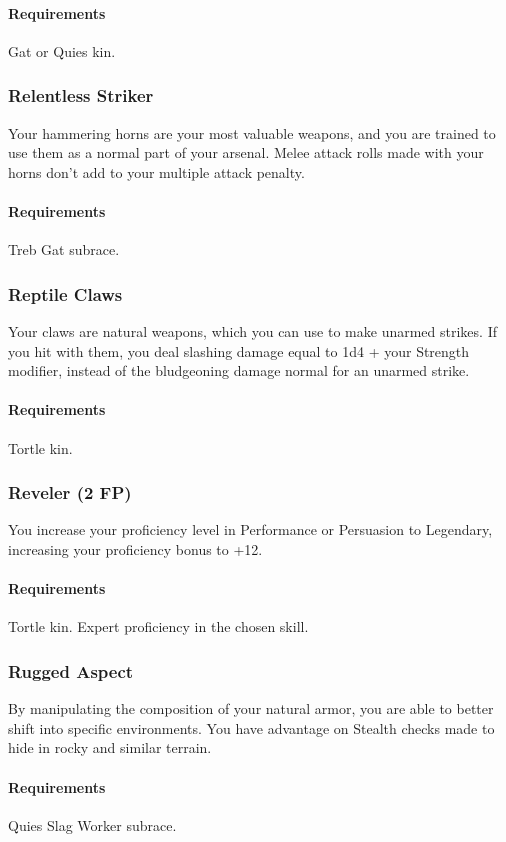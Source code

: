     \paragraph{Requirements} Gat or Quies kin.
\subsubsection{Relentless Striker} \label{feat::relentlessstriker}
    Your hammering horns are your most valuable weapons, and you are trained to use them as a normal part of your arsenal.
    Melee attack rolls made with your horns don't add to your multiple attack penalty.
    \paragraph{Requirements} Treb Gat subrace.
\subsubsection{Reptile Claws} \label{feat::reptileclaws}
    Your claws are natural weapons, which you can use to make unarmed strikes.
    If you hit with them, you deal slashing damage equal to 1d4 + your Strength modifier, instead of the bludgeoning damage normal for an unarmed strike.
    \paragraph{Requirements} Tortle kin.
\subsubsection{Reveler (2 FP)} \label{feat::reveler}
    You increase your proficiency level in Performance or Persuasion to Legendary, increasing your proficiency bonus to +12.
    \paragraph{Requirements} Tortle kin. Expert proficiency in the chosen skill.
\subsubsection{Rugged Aspect} \label{feat::ruggedaspect}
    By manipulating the composition of your natural armor, you are able to better shift into specific environments.
    You have advantage on Stealth checks made to hide in rocky and similar terrain.
    \paragraph{Requirements} Quies Slag Worker subrace.
